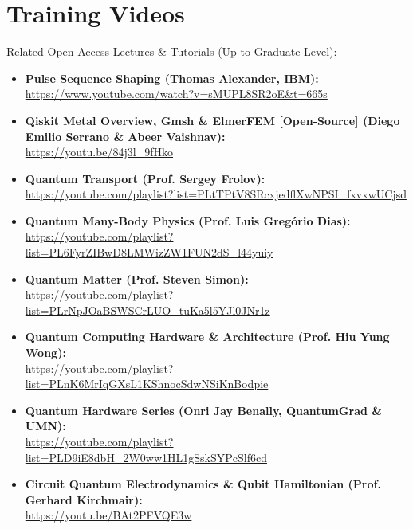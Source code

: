 \chapter{\LARGE{Training Videos}}

\begin{flushleft}
\large Related Open Access Lectures \& Tutorials (Up to Graduate-Level):
\end{flushleft}

\normalsize\begin{itemize}

  \item\textbf{Pulse Sequence Shaping (Thomas Alexander, IBM):}\\
\url{https://www.youtube.com/watch?v=sMUPL8SR2oE&t=665s}

  \item\textbf{Qiskit Metal Overview, Gmsh \& ElmerFEM [Open-Source] (Diego Emilio Serrano \& Abeer Vaishnav):}\\
\url{https://youtu.be/84j3l_9fHko}

  \item\textbf{Quantum Transport (Prof. Sergey Frolov):}\\
\url{https://youtube.com/playlist?list=PLtTPtV8SRcxjedflXwNPSI_fxvxwUCjsd}

  \item\textbf{Quantum Many-Body Physics (Prof. Luis Gregório Dias):}\\
\url{https://youtube.com/playlist?list=PL6FyrZIBwD8LMWizZW1FUN2dS_l44yuiy}

  \item\textbf{Quantum Matter (Prof. Steven Simon):}\\
\url{https://youtube.com/playlist?list=PLrNpJOaBSWSCrLUO_tuKa5l5YJl0JNr1z}

  \item\textbf{Quantum Computing Hardware \& Architecture (Prof. Hiu Yung Wong):}\\
\url{https://youtube.com/playlist?list=PLnK6MrIqGXsL1KShnocSdwNSiKnBodpie}

  \item\textbf{Quantum Hardware Series (Onri Jay Benally, QuantumGrad \& UMN):}\\
\url{https://youtube.com/playlist?list=PLD9iE8dbH_2W0ww1HL1gSskSYPcSlf6cd}

  \item\textbf{Circuit Quantum Electrodynamics \& Qubit Hamiltonian (Prof. Gerhard Kirchmair):}\\
\url{https://youtu.be/BAt2PFVQE3w}


\end{itemize}
